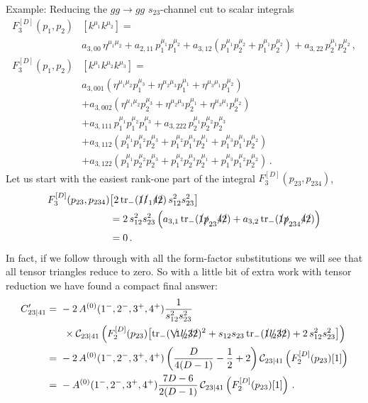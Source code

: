 \begin{example}{Example: Reducing the $gg\to gg$ $s_{23}$-channel cut to scalar integrals}
\begin{align}
  F^{[D]}_{3}(p_1,p_2)&[k^{\mu_1}k^{\mu_2}] = \nonumber\\
  & a_{3,00} \, \eta^{\mu_1\mu_2} + a_{2,11} \, p_1^{\mu_1} p_1^{\mu_2}
  + a_{3,12} \left( p_1^{\mu_1} p_2^{\mu_2} + p_1^{\mu_1} p_2^{\mu_2} \right)
  + a_{3,22} \, p_2^{\mu_1} p_2^{\mu_2} \,, \label{eq:PVtriR2dec}\\
  F^{[D]}_{3}(p_1,p_2)&[k^{\mu_1}k^{\mu_2} k^{\mu_3}] = \nonumber\\&
    a_{3,001} \left( \eta^{\mu_1\mu_2} p_1^{\mu_3} + \eta^{\mu_2\mu_3} p_1^{\mu_1} + \eta^{\mu_3\mu_1} p_1^{\mu_2}\right) \nonumber\\&
  + a_{3,002} \left( \eta^{\mu_1\mu_2} p_2^{\mu_3} + \eta^{\mu_2\mu_3} p_2^{\mu_1} + \eta^{\mu_3\mu_1} p_2^{\mu_2}\right) \nonumber\\&
  + a_{3,111} \, p_1^{\mu_1} p_1^{\mu_2} p_1^{\mu_3}
  + a_{3,222} \, p_2^{\mu_1} p_2^{\mu_2} p_2^{\mu_3} \nonumber\\&
  + a_{3,112} \left(p_1^{\mu_1} p_1^{\mu_2} p_2^{\mu_3} + p_1^{\mu_2} p_1^{\mu_3} p_2^{\mu_1} + p_1^{\mu_3} p_1^{\mu_1} p_2^{\mu_2} \right) \nonumber\\&
  + a_{3,122} \left(p_1^{\mu_1} p_2^{\mu_2} p_2^{\mu_3} + p_1^{\mu_2} p_2^{\mu_3} p_2^{\mu_1} + p_1^{\mu_3} p_1^{\mu_2} p_2^{\mu_2} \right) \,.
\label{eq:PVtriR3dec}
\end{align}
Let us start with the easiest rank-one part of the integral $F_3^{[D]}(p_{23},p_{234})$,
\begin{align}
  F_3^{[D]}(p_{23},p_{234})&\bigl[ 2 \, {\rm tr}_-( \slashed{1} \slashed{l}_1 \slashed{4} \slashed{2} ) \, s_{12}^2s_{23}^2 \bigr] \nonumber\\
  &= 2  \, s_{12}^2s_{23}^2 \left( a_{3,1} \, {\rm tr}_-( \slashed{1} \slashed{p}_{23} \slashed{4} \slashed{2} ) + a_{3,2} \, {\rm tr}_-( \slashed{1} \slashed{p}_{234} \slashed{4} \slashed{2} )\right) \nonumber\\
 &= 0 \,.
\end{align}
In fact, if we follow through with all the form-factor substitutions we will
see that all tensor triangles reduce to zero. So with a little bit of extra
work with tensor reduction we have found a compact final answer:
\begin{align}
  C'_{23|41} = \ & - 2 \, A^{(0)}(1^-,2^-,3^+,4^+) \frac{1}{s_{12}^2s_{23}^2} \nonumber\\
  & \ \times \mathcal{C}_{23|41}\left(F_2^{[D]}(p_{23})\bigl[\trm\1{l_2}32^2 + s_{12}s_{23} \, \trm1{l_2}32 + 2 \, s_{12}^2s_{23}^2 \bigr]\right)
   \nonumber\\
  = \ & -2 \, A^{(0)}(1^-,2^-,3^+,4^+) \left( \frac{D}{4 (D-1)} -\frac{1}{2} + 2 \right) \mathcal{C}_{23|41}\left(F_2^{[D]}(p_{23})[1]\right) \nonumber\\
  = \ & - A^{(0)}(1^-,2^-,3^+,4^+) \frac{7D-6}{2(D-1)} \, \mathcal{C}_{23|41}\left(F_2^{[D]}(p_{23})[1]\right) \,.
\end{align}
\end{example}

